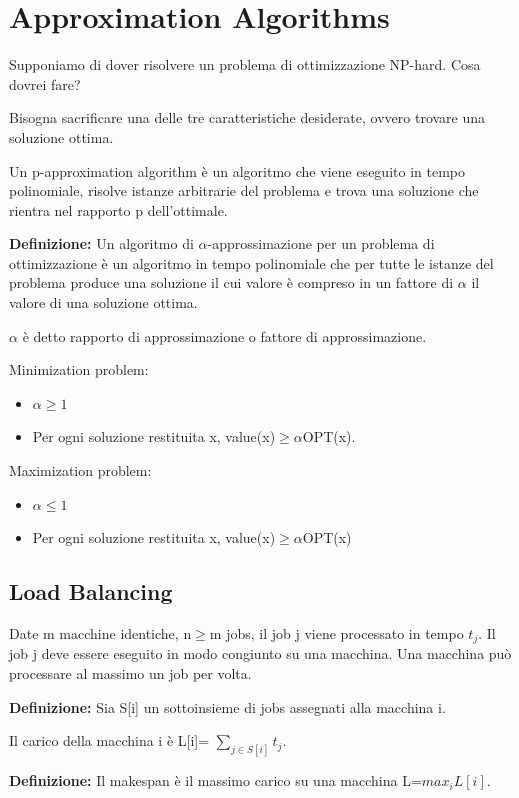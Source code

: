 \documentclass{article}
\begin{document}
\section{Approximation Algorithms}
Supponiamo di dover risolvere un problema di ottimizzazione NP-hard. Cosa dovrei fare?

\noindent Bisogna sacrificare una delle tre caratteristiche desiderate, ovvero trovare una soluzione ottima.

\noindent Un p-approximation algorithm è un algoritmo che viene eseguito in tempo polinomiale, risolve istanze arbitrarie del problema e trova una soluzione che rientra nel rapporto p dell'ottimale.

\noindent \textbf{Definizione:} Un algoritmo di $\alpha$-approssimazione per un problema di ottimizzazione è un algoritmo in tempo polinomiale che per tutte le istanze del problema produce una soluzione il cui valore è compreso in un fattore di $\alpha$ il valore di una soluzione ottima.

\noindent $\alpha$ è detto rapporto di approssimazione o fattore di approssimazione.

\noindent Minimization problem:
\begin{itemize}
    \item $\alpha \geq 1$
    \item Per ogni soluzione restituita x, value(x)$\geq\alpha$OPT(x).
\end{itemize}
\noindent Maximization problem:
\begin{itemize}
    \item $\alpha\leq 1$
    \item Per ogni soluzione restituita x, value(x)$\geq\alpha$OPT(x)
\end{itemize}
\subsection{Load Balancing}
Date m macchine identiche, n$\geq$m jobs, il job j viene processato in tempo $t_j$. Il job j deve essere eseguito in modo congiunto su una macchina. Una macchina può processare al massimo un job per volta.

\noindent \textbf{Definizione:} Sia S[i] un sottoinsieme di jobs assegnati alla macchina i. 

\noindent Il carico della macchina i è L[i]= $\sum_{j\in S[i]}t_j$.

\noindent\textbf{Definizione: } Il makespan è il massimo carico su una macchina L=$max_iL[i]$.
\end{document}
